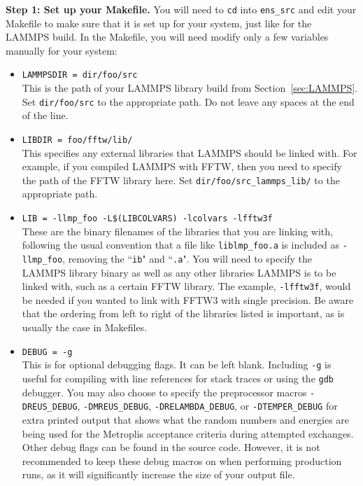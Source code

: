 \documentclass[10pt]{article}
\begin{document}
\textbf{Step 1: Set up your Makefile.}
You will need to \texttt{cd} into \texttt{ens\_src} and edit your Makefile to 
make sure that it is set up for your system, just like for the LAMMPS build.
In the Makefile, you will need modify only a few variables manually for your system:
\begin{itemize}
	\item \texttt{LAMMPSDIR = dir/foo/src}\\
		  	This is the path of your LAMMPS library build from Section~\ref{sec:LAMMPS}.
		  	Set \texttt{dir/foo/src} to the appropriate path. Do not leave any spaces at the end of the line.
		  
	\item \texttt{LIBDIR = foo/fftw/lib/}\\
			This specifies any external libraries that LAMMPS should be linked with. For example,
			if you compiled LAMMPS with FFTW, then you need to specify the path of the FFTW
			library here. Set \texttt{dir/foo/src\_lammps\_lib/} to the appropriate path.
			
	\item \texttt{LIB = -llmp\_foo -L\$(LIBCOLVARS) -lcolvars -lfftw3f}\\
			These are the binary filenames of the libraries that you are linking with, following
			the usual convention that a file like \texttt{liblmp\_foo.a} is included as
			\texttt{-llmp\_foo}, removing the ``\texttt{ib}" and ``\texttt{.a}". You will
			need to specify the LAMMPS library binary as well as any other libraries LAMMPS
			is to be linked with, such as a certain FFTW library. The example, \texttt{-lfftw3f},
			would be needed if you wanted to link with FFTW3 with single precision. Be aware that the ordering
			from left to right of the libraries listed is important, as is usually the case in Makefiles.
			
	\item \texttt{DEBUG = -g}\\
			This is for optional debugging flags. It can be left blank. Including \texttt{-g}
			is useful for compiling with line references for stack traces or using the 
			\texttt{gdb} debugger. You may also choose to specify the preprocessor macros
			\texttt{-DREUS\_DEBUG}, 
			\texttt{-DMREUS\_DEBUG},
			\texttt{-DRELAMBDA\_DEBUG}, or
			\texttt{-DTEMPER\_DEBUG}
			for extra printed output that shows what the random
			numbers and energies are being used for the Metroplis acceptance criteria
			during attempted exchanges. Other debug flags can be found in the source code.
			However, it is not recommended to keep these debug macros on when performing 
			production runs, as it will significantly increase the size of your output file.
			

\end{itemize}
\end{document}
